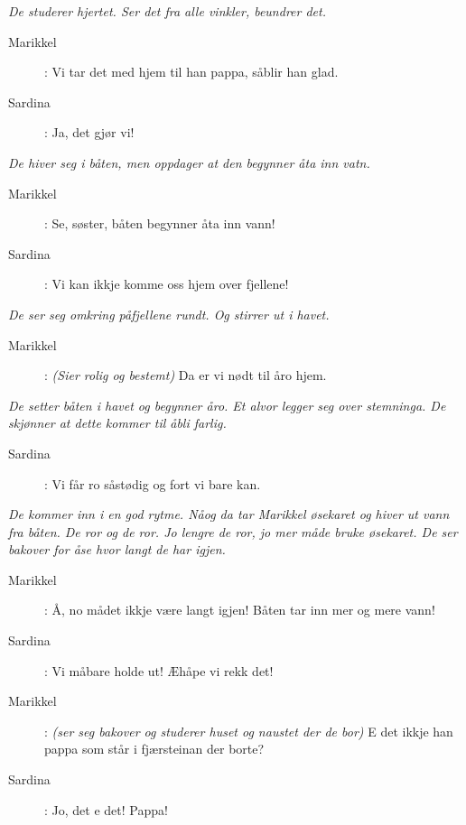 {\noindent \textit{\color{gray} De studerer hjertet. Ser det fra alle vinkler, beundrer det.}

\begin{description}
\item[Marikkel]: Vi tar det med hjem til han pappa, s\aa  blir han glad.
\item[Sardina]: Ja, det gj\o{}r vi!
\end{description}

\noindent \textit{\color{gray} De hiver seg i b\aa ten, men oppdager at den begynner \aa  ta inn vatn.}

\begin{description}
\item[Marikkel]: Se, s\o{}ster, b\aa ten begynner \aa  ta inn vann!
\item[Sardina]: Vi kan ikkje komme oss hjem over fjellene!
\end{description}

\noindent \textit{\color{gray} De ser seg omkring p\aa  fjellene rundt. Og stirrer ut i havet.}

\begin{description}
\item[Marikkel]: \textit{\color{gray} (Sier rolig og bestemt)} Da er vi n\o{}dt til \aa  ro hjem. 
\end{description}

\noindent \textit{\color{gray} De setter b\aa ten i havet og begynner \aa  ro. Et alvor legger seg over stemninga. De skj\o{}nner at dette kommer til \aa  bli farlig.} 

\begin{description}
\item[Sardina]: Vi f\aa r ro s\aa  st\o{}dig og fort vi bare kan. 
\end{description}

\noindent \textit{\color{gray} De kommer inn i en god rytme. N\aa  og da tar Marikkel \o{}sekaret og hiver ut vann fra b\aa ten. De ror og de ror. Jo lengre de ror, jo mer m\aa  de bruke \o{}sekaret. De ser bakover for \aa  se hvor langt de har igjen.}

\begin{description}
\item[Marikkel]: \AA , no m\aa  det ikkje v\ae re langt igjen! B\aa ten tar inn mer og mere vann! 
\item[Sardina]: Vi m\aa  bare holde ut! \AE  h\aa pe vi rekk det!
\item[Marikkel]: \textit{\color{gray} (ser seg bakover og studerer huset og naustet der de bor)} E det ikkje han pappa som st\aa r i fj\ae rsteinan der borte?
\item[Sardina]: Jo, det e det! Pappa!
\end{description}

}
